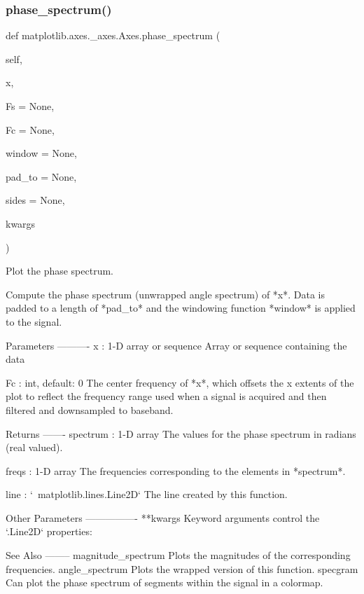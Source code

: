 \begin{DoxyVerb}
\subsubsection{\texorpdfstring{phase\+\_\+spectrum()}{phase\_spectrum()}}
{\footnotesize\ttfamily def matplotlib.\+axes.\+\_\+axes.\+Axes.\+phase\+\_\+spectrum (\begin{DoxyParamCaption}\item[{}]{self,  }\item[{}]{x,  }\item[{}]{Fs = {\ttfamily None},  }\item[{}]{Fc = {\ttfamily None},  }\item[{}]{window = {\ttfamily None},  }\item[{}]{pad\+\_\+to = {\ttfamily None},  }\item[{}]{sides = {\ttfamily None},  }\item[{}]{kwargs }\end{DoxyParamCaption})}

\begin{DoxyVerb}Plot the phase spectrum.

Compute the phase spectrum (unwrapped angle spectrum) of *x*.
Data is padded to a length of *pad_to* and the windowing function
*window* is applied to the signal.

Parameters
----------
x : 1-D array or sequence
    Array or sequence containing the data



Fc : int, default: 0
    The center frequency of *x*, which offsets the x extents of the
    plot to reflect the frequency range used when a signal is acquired
    and then filtered and downsampled to baseband.

Returns
-------
spectrum : 1-D array
    The values for the phase spectrum in radians (real valued).

freqs : 1-D array
    The frequencies corresponding to the elements in *spectrum*.

line : `~matplotlib.lines.Line2D`
    The line created by this function.

Other Parameters
----------------
**kwargs
    Keyword arguments control the `.Line2D` properties:


See Also
--------
magnitude_spectrum
    Plots the magnitudes of the corresponding frequencies.
angle_spectrum
    Plots the wrapped version of this function.
specgram
    Can plot the phase spectrum of segments within the signal in a
    colormap.
\end{DoxyVerb}
 \mbox{\label{classmatplotlib_1_1axes_1_1__axes_1_1Axes_ae60208a653a0074355baac9751f6a617}} 

\end{DoxyVerb}
